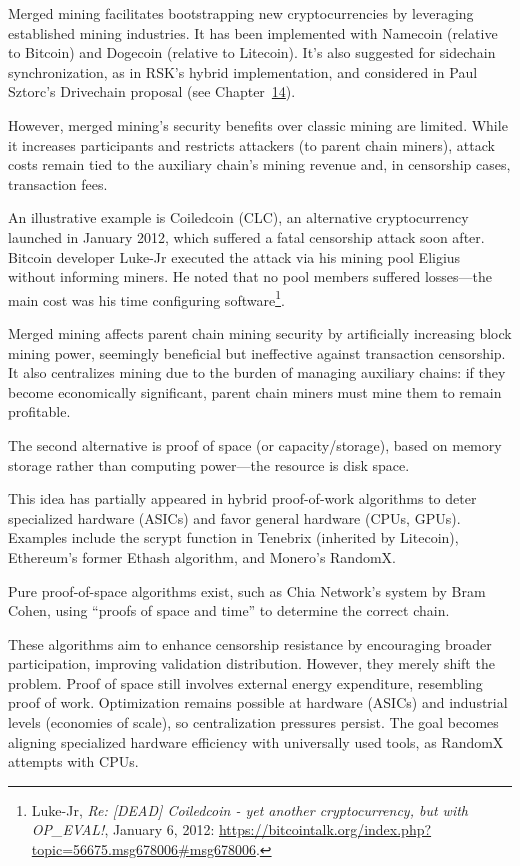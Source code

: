 \documentclass[
  a5paper,
  smalldemyvopaper,10pt,twoside,onecolumn,openright,extrafontsizes,hidelinks]{memoir}
\begin{document}
Merged mining facilitates bootstrapping new cryptocurrencies by
leveraging established mining industries. It has been implemented with
Namecoin (relative to Bitcoin) and Dogecoin (relative to Litecoin). It's
also suggested for sidechain synchronization, as in RSK's hybrid
implementation, and considered in Paul Sztorc's Drivechain proposal (see
Chapter~\hyperref[ch:scalabilite]{14}).

However, merged mining's security benefits over classic mining are
limited. While it increases participants and restricts attackers (to
parent chain miners), attack costs remain tied to the auxiliary chain's
mining revenue and, in censorship cases, transaction fees.

An illustrative example is Coiledcoin (CLC), an alternative
cryptocurrency launched in January 2012, which suffered a fatal
censorship attack soon after. Bitcoin developer Luke-Jr executed the
attack via his mining pool Eligius without informing miners. He noted
that no pool members suffered losses---the main cost was his time
configuring software\footnote{Luke-Jr, \emph{Re: {[}DEAD{]} Coiledcoin -
  yet another cryptocurrency, but with OP\_EVAL!}, January 6, 2012:
  \url{https://bitcointalk.org/index.php?topic=56675.msg678006\#msg678006}.}.

Merged mining affects parent chain mining security by artificially
increasing block mining power, seemingly beneficial but ineffective
against transaction censorship. It also centralizes mining due to the
burden of managing auxiliary chains: if they become economically
significant, parent chain miners must mine them to remain profitable.

The second alternative is proof of space (or capacity/storage), based on
memory storage rather than computing power---the resource is disk space.

This idea has partially appeared in hybrid proof-of-work algorithms to
deter specialized hardware (ASICs) and favor general hardware (CPUs,
GPUs). Examples include the scrypt function in Tenebrix (inherited by
Litecoin), Ethereum's former Ethash algorithm, and Monero's RandomX.

Pure proof-of-space algorithms exist, such as Chia Network's system by
Bram Cohen, using ``proofs of space and time'' to determine the correct
chain.

These algorithms aim to enhance censorship resistance by encouraging
broader participation, improving validation distribution. However, they
merely shift the problem. Proof of space still involves external energy
expenditure, resembling proof of work. Optimization remains possible at
hardware (ASICs) and industrial levels (economies of scale), so
centralization pressures persist. The goal becomes aligning specialized
hardware efficiency with universally used tools, as RandomX attempts
with CPUs.
\end{document}
